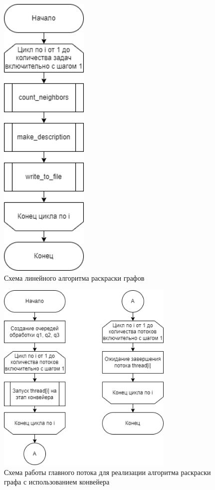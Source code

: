 \clearpage

\begin{figure}[h!btp]
	\centering
	\includegraphics[width=120pt]{inc/linear.png}
	\caption{Схема линейного алгоритма раскраски графов}
	\label{fig:linear}	
\end{figure}

\clearpage

\begin{figure}[h!btp]
	\centering
	\includegraphics[width=240pt]{inc/parallel.png}
	\caption{Схема работы главного потока для реализации алгоритма раскраски графа с использованием конвейера}
	\label{fig:parallel}	
\end{figure}

